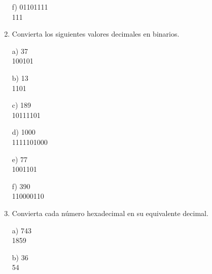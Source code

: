 \documentclass[a4paper, 12pt]{article}
\newcommand{\Aspace}{0.2cm}
\begin{document}
\begin{enumerate}
            \vspace{\Aspace} \par
            f) 01101111
            \\ { \color{azul} 111 }


        \item Convierta los siguientes valores decimales en binarios.
            \vspace{\Aspace} \par
            a) 37
            \\ { \color{azul} 100101 }

            \vspace{\Aspace} \par
            b) 13
            \\ { \color{azul} 1101 }

            \vspace{\Aspace} \par
            c) 189
            \\ { \color{azul} 10111101 }

            \vspace{\Aspace} \par
            d) 1000
            \\ { \color{azul} 1111101000 }

            \vspace{\Aspace} \par
            e) 77
            \\ { \color{azul} 1001101 }

            \vspace{\Aspace} \par
            f) 390
            \\ { \color{azul} 110000110 }


        \newpage
        \item Convierta cada número hexadecimal en su equivalente decimal.
            \vspace{\Aspace} \par
            a) 743
            \\ { \color{azul} 1859 }

            \vspace{\Aspace} \par
            b) 36
            \\ { \color{azul} 54 }


\end{enumerate}
\end{document}
